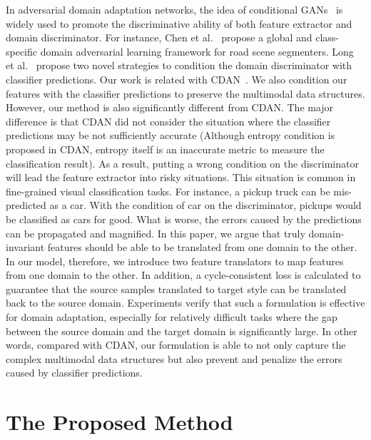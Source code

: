 \documentclass[sigconf]{acmart}
\begin{document}
In adversarial domain adaptation networks, the idea of conditional GANs~\cite{mirza2014conditional} is widely used to promote the discriminative ability of both feature extractor and domain discriminator. For instance, Chen et al.~\cite{chen2017no} propose a global and class-specific domain adversarial learning framework for road scene segmenters. Long et al.~\cite{long2018conditional} propose two novel strategies to condition the domain discriminator with classifier predictions. Our work is related with CDAN~\cite{long2018conditional}. We also condition our features with the classifier predictions to preserve the multimodal data structures. However, our method is also significantly different from CDAN. The major difference is that CDAN did not consider the situation where the classifier predictions may be not sufficiently accurate (Although entropy condition is proposed in CDAN, entropy itself is an inaccurate metric to measure the classification result). As a result, putting a wrong condition on the discriminator will lead the feature extractor into risky situations. This situation is common in fine-grained visual classification tasks. For instance, a pickup truck can be mis-predicted as a car. With the condition of car on the discriminator, pickups would be classified as cars for good. What is worse, the errors caused by the predictions can be propagated and magnified. In this paper, we argue that truly domain-invariant features should be able to be translated from one domain to the other. In our model, therefore, we introduce two feature translators to map features from one domain to the other. In addition, a cycle-consistent loss is calculated to guarantee that the source samples translated to target style can be translated back to the source domain. Experiments verify that such a formulation is effective for domain adaptation, especially for relatively difficult tasks where the gap between the source domain and the target domain is significantly large. In other words, compared with CDAN, our formulation is able to not only capture the complex multimodal data structures but also prevent and penalize the errors caused by classifier predictions.




\section{The Proposed Method}
\end{document}
